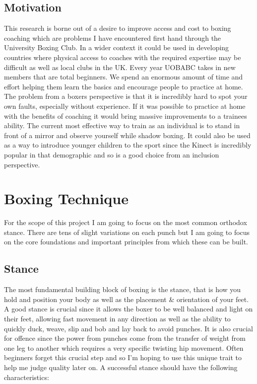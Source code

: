 \subsection{Motivation}
\label{subsec:subsec01}
This research is borne out of a desire to improve access and cost to boxing coaching which are problems I have encountered first hand through the University Boxing Club. In a wider context it could be used in developing countries where physical access to coaches with the required expertise may be difficult as well as local clubs in the UK.
Every year UOBABC takes in new members that are total beginners. We spend an enormous amount of time and effort helping them learn the basics and encourage people to practice at home. The problem from a boxers perspective is that it is incredibly hard to spot your own faults, especially without experience.
If it was possible to practice at home with the benefits of coaching it would bring massive improvements to a trainees ability. The current most effective way to train as an individual is to stand in front of a mirror and observe yourself while shadow boxing.
It could also be used as a way to introduce younger children to the sport since the Kinect is incredibly popular in that demographic and so 
is a good choice from an inclusion perspective.
\section{Boxing Technique}
\label{sec:sec02}
For the scope of this project I am going to focus on the most common orthodox stance. There are tens of slight variations on each punch but I am going to focus on the core foundations and important principles from which these can be built.
\subsection{Stance}
\label{subsec:subsec02}
The most fundamental building block of boxing is the stance, that is how you hold and position your body as well as the placement \& orientation of your feet. A good stance is crucial since it allows the boxer to be well balanced and light on their feet, allowing fast movement in any direction as well as the ability to quickly duck, weave, slip and bob and lay back to avoid punches. It is also crucial for offence since the power from punches come from the transfer of weight from one leg to another which requires a very specific twisting hip movement. Often beginners forget this crucial step and so I'm hoping to use this unique trait to help me judge quality later on. A successful stance should have the following characteristics:

